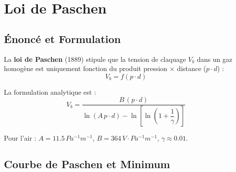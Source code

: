 \documentclass[12pt, a4paper, twoside]{report}
\begin{document}
\section{Loi de Paschen}

\subsection{Énoncé et Formulation}

La \textbf{loi de Paschen} (1889) stipule que la tension de claquage $V_b$ dans un gaz
homogène est uniquement fonction du produit pression $\times$ distance ($p \cdot d$) :
\begin{equation}
  \boxed{V_b = f(p \cdot d)}
\end{equation}

La formulation analytique est :
\begin{equation}
  V_b = \frac{B\,(p\cdot d)}{\ln(A\,p\cdot d) - \ln\!\left[\ln\!\left(1 + \dfrac{1}{\gamma}\right)\right]}
  \label{eq:paschen}
\end{equation}

Pour l'air : $A = 11.5\,\si{Pa^{-1}m^{-1}}$, $B = 364\,\si{V\cdot Pa^{-1}m^{-1}}$,
$\gamma \approx 0.01$.

\subsection{Courbe de Paschen et Minimum}
\end{document}
